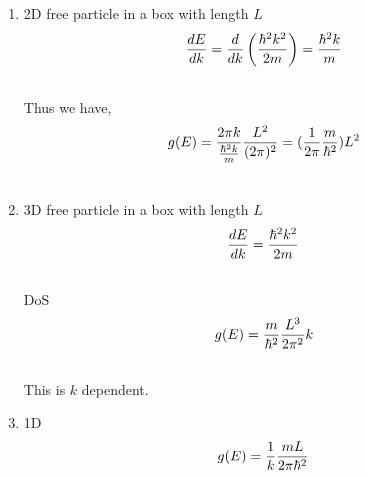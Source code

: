 \documentclass[letterpaper,10pt,english]{sphinxmanual}
\begin{document}
\label{equilibrium/week2:examples-of-dos}\begin{enumerate}
\item {} 
2D free particle in a box with length $L$
\begin{gather}
\begin{split}\frac{d E}{d k} = \frac{d}{d k}\left( \frac{\hbar^2 k^2}{2m} \right) = \frac{\hbar^2 k}{m}\end{split}\notag\\\begin{split}\end{split}\notag
\end{gather}
Thus we have,
\begin{gather}
\begin{split}g(E) = \frac{2\pi k }{\frac{\hbar^2 k}{m}} \frac{L^2}{(2\pi)^2} = (\frac{1}{2\pi} \frac{m}{\hbar^2})L^2\end{split}\notag\\\begin{split}\end{split}\notag
\end{gather}
\item {} 
3D free particle in a box with length $L$
\begin{gather}
\begin{split}\frac{d E}{d k} = \frac{\hbar^2 k^2}{2m}\end{split}\notag\\\begin{split}\end{split}\notag
\end{gather}
DoS
\begin{gather}
\begin{split}g(E) = \frac{m}{\hbar^2} \frac{L^3}{2\pi^2} k\end{split}\notag\\\begin{split}\end{split}\notag
\end{gather}
This is $k$ dependent.

\item {} 
1D
\begin{gather}
\begin{split}g(E) = \frac{1}{k} \frac{m L}{2\pi \hbar^2}\end{split}\notag\\\begin{split}\end{split}\notag
\end{gather}
\end{enumerate}
\end{document}
